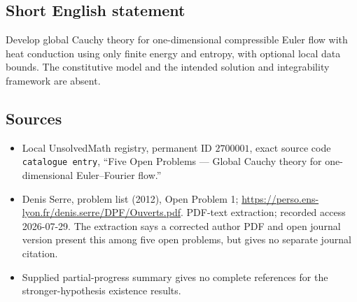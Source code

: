 \documentclass[11pt]{article}
\begin{document}
\subsection{Short English statement}
Develop global Cauchy theory for one-dimensional compressible Euler flow with heat conduction using only finite energy and entropy, with optional local data bounds. The constitutive model and the intended solution and integrability framework are absent.
\subsection{Sources}
\begin{itemize}
\item Local UnsolvedMath registry, permanent ID \(2700001\), exact source code \texttt{catalogue entry}, ``Five Open Problems --- Global Cauchy theory for one-dimensional Euler--Fourier flow.''
\item Denis Serre, problem list (2012), Open Problem 1; \url{https://perso.ens-lyon.fr/denis.serre/DPF/Ouverts.pdf}. PDF-text extraction; recorded access 2026-07-29. The extraction says a corrected author PDF and open journal version present this among five open problems, but gives no separate journal citation.
\item Supplied partial-progress summary gives no complete references for the stronger-hypothesis existence results.
\end{itemize}
\end{document}
